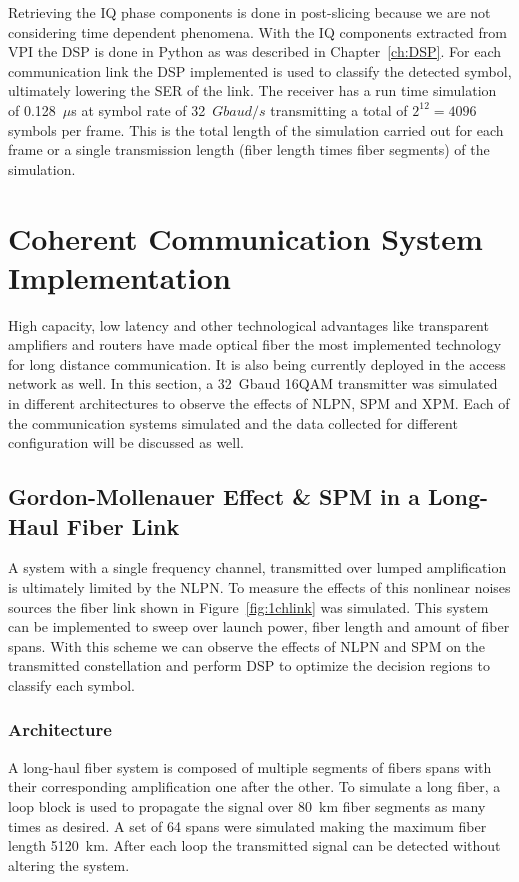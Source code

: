 Retrieving the IQ phase components is done in post-slicing because we are not considering time dependent phenomena. With the IQ components extracted from VPI the DSP is done in Python as was described in Chapter~\ref{ch:DSP}. For each communication link the DSP implemented is used to classify the detected symbol, ultimately lowering the SER of the link. The receiver has a run time simulation of 0.128~$\mu$s at symbol rate of 32~$Gbaud/s$ transmitting a total of $2^{12}=4096$ symbols per frame. This is the total length of the simulation carried out for each frame or a single transmission length (fiber length times fiber segments) of the simulation.


\section{Coherent Communication System Implementation}

High capacity, low latency and other technological advantages like transparent amplifiers and routers have made optical fiber the most implemented technology for long distance communication. It is also being currently deployed in the access network as well. In this section, a 32~Gbaud 16QAM transmitter was simulated in different architectures to observe the effects of NLPN, SPM and XPM. Each of the communication systems simulated and the data collected for different configuration will be discussed as well. 


\subsection{Gordon-Mollenauer Effect \& SPM in a Long-Haul Fiber Link }
A system with a single frequency channel, transmitted over lumped amplification is ultimately limited by the NLPN. To measure the effects of this nonlinear noises sources the fiber link shown in Figure~\ref{fig:1chlink} was simulated. This system can be implemented to sweep over launch power, fiber length and amount of fiber spans. With this scheme we can observe the effects of NLPN and SPM on the transmitted constellation and perform DSP to optimize the decision regions to classify each symbol.


\subsubsection{Architecture}
A long-haul fiber system is composed of multiple segments of fibers spans with their corresponding amplification one after the other. To simulate a long fiber, a loop block is used to propagate the signal over 80~km fiber segments as many times as desired. A set of 64 spans were simulated making the maximum fiber length 5120~km. After each loop the transmitted signal can be detected without altering the system. 
 

